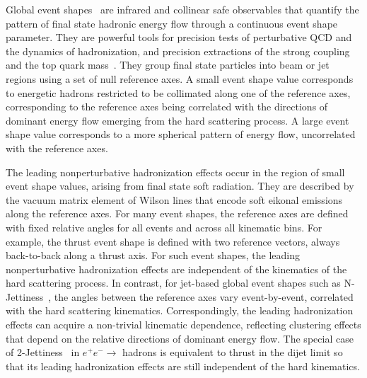 \documentclass[prd,aps,nofootinbib,twocolumn,showpacs,amsmath,superscriptaddress]{revtex4-2}
\begin{document}
\maketitle


Global event shapes~\cite{Dasgupta:2003iq,Banfi:2010xy,Stagnitto:2025air,Brandt:1964sa,Farhi:1977sg,Rakow:1981qn,Parisi:1978eg,Catani:1991bd,Stewart:2010tn,Antonelli:1999kx,Dasgupta:2001sh,Dasgupta:2001eq,Dasgupta:2002bw,Dasgupta:2002dc} are infrared and collinear safe observables that quantify the pattern of final state hadronic energy flow through a continuous event shape parameter. They are powerful tools for precision tests of perturbative QCD and the dynamics of hadronization, and precision extractions of the strong coupling~\cite{Becher:2008cf, Abbate:2010xh,Abbate:2012jh,Bell:2023dqs,Benitez:2024nav,Benitez:2025vsp} and the top quark mass~\cite{Fleming:2007qr,Fleming:2007xt,Bachu:2020nqn,Dehnadi:2023msm}.  They group final state particles into beam or jet regions using a set of null reference axes. 
A small event shape value corresponds to   energetic hadrons  restricted to be  collimated along one of the reference axes, corresponding to the reference axes being correlated  with the directions of dominant energy flow emerging from the  hard scattering process.  A large event shape value corresponds to a more spherical pattern of energy flow, uncorrelated with the reference axes. 
%

The leading nonperturbative hadronization effects occur in the region of  small event shape values, arising from final state soft radiation. They are described by the vacuum matrix element of Wilson lines that encode soft eikonal emissions along the reference axes. For many event shapes, the reference axes are defined with fixed relative angles for all events and across all kinematic bins. For example, the thrust event shape is defined with two reference vectors, always back-to-back along a thrust axis. For such event shapes, the leading nonperturbative hadronization effects are independent of the kinematics of the hard scattering process. In contrast, for jet-based global event shapes such as N-Jettiness~\cite{Stewart:2010tn}, the angles between the  reference axes  vary event-by-event,  correlated with the hard scattering kinematics. Correspondingly, the leading hadronization  effects can acquire a non-trivial kinematic dependence, reflecting clustering effects  that depend on the relative directions of dominant energy flow. The special case of 2-Jettiness~\cite{Becher:2008cf, Abbate:2010xh,Abbate:2012jh,Bell:2023dqs,Benitez:2024nav,Benitez:2025vsp,Fleming:2007qr,Fleming:2007xt,Bachu:2020nqn,Dehnadi:2023msm} in $e^+e^-\to$ hadrons is equivalent to thrust in the dijet limit so that its leading hadronization effects are still independent of the hard kinematics.
\end{document}
